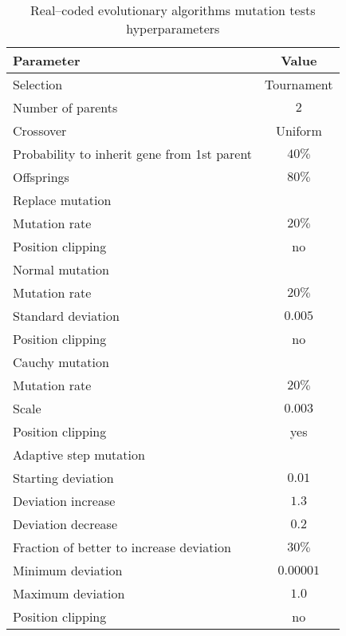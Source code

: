 \begin{table}[h]
    \centering
    \begin{tabular}{|l|c|}
        \hline
        \textbf{Parameter} & \textbf{Value} \\
        \hline
        Selection & Tournament \\
        \quad Number of parents & $2$ \\
        Crossover & Uniform \\
        \quad Probability to inherit gene from 1st parent & $40\%$ \\
        \quad Offsprings & $80\%$ \\
        \hline
        Replace mutation & \\
        \quad Mutation rate & $20\%$ \\
        \quad Position clipping & no \\
        Normal mutation & \\
        \quad Mutation rate & $20\%$ \\
        \quad Standard deviation & $0.005$ \\
        \quad Position clipping & no \\
        Cauchy mutation & \\
        \quad Mutation rate & $20\%$ \\
        \quad Scale & $0.003$ \\
        \quad Position clipping & yes \\
        Adaptive step mutation & \\
        \quad Starting deviation & $0.01$ \\
        \quad Deviation increase & $1.3$ \\
        \quad Deviation decrease & $0.2$ \\
        \quad Fraction of better to increase deviation & $30\%$ \\
        \quad Minimum deviation & $0.00001$ \\
        \quad Maximum deviation & $1.0$ \\
        \quad Position clipping & no \\
        \hline
    \end{tabular}
    \caption{Real--coded evolutionary algorithms mutation tests hyperparameters}
    \label{tab:esmutationhyperparmarameters}
\end{table}

